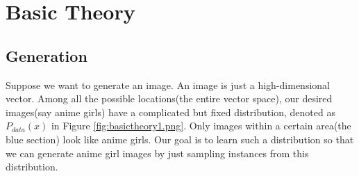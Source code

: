 \documentclass{../templates/ainote}
\begin{document}
\section{Basic Theory}

\subsection{Generation}
Suppose we want to generate an image. An image is just a high-dimensional vector. Among all the possible locations(the entire vector space), our desired images(say anime girls) have a complicated but fixed distribution, denoted as $P_{data}(x)$ in Figure \ref{fig:basictheory1.png}.
Only images within a certain area(the blue section) look like anime girls. Our goal is to learn such a distribution so that we can generate anime girl images by just sampling instances from this distribution.
\end{document}
